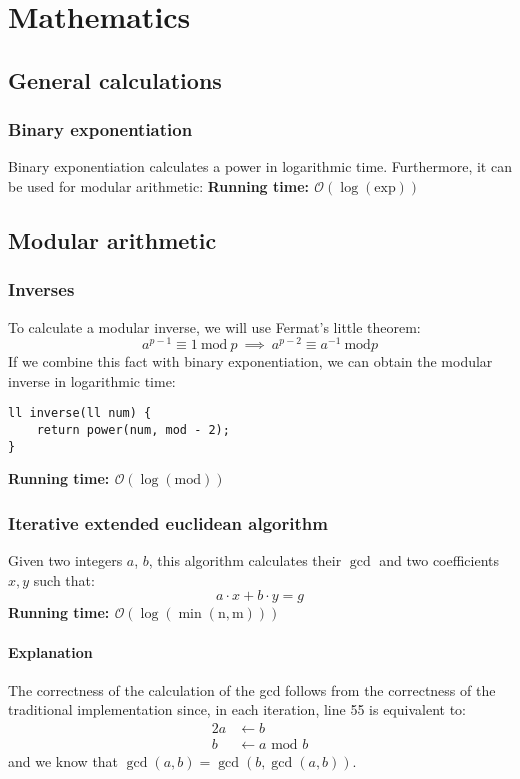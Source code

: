 \chapter{Mathematics}

\section{General calculations}
\subsection{Binary exponentiation}
Binary exponentiation calculates a power in logarithmic 
time. Furthermore, it can be used for modular arithmetic:
\noindent \textbf{\boldmath Running time: $\mathcal{O}(\log(\mathrm{exp}))$}


\newpage
\section{Modular arithmetic}
\subsection{Inverses}
To calculate a modular inverse, we will use Fermat's little theorem:
\[
	a^{p-1}\equiv 1 \ \mathrm{mod} \ p  \ \implies \  a^{p-2}\equiv a^{-1} \ \mathrm{mod} p
\]
If we combine this fact with binary exponentiation, we can obtain the 
modular inverse in logarithmic time:
\begin{verbatim}
ll inverse(ll num) {
    return power(num, mod - 2);
}
\end{verbatim}
\noindent \textbf{\boldmath Running time: $\mathcal{O}(\log(\mathrm{mod}))$}

\subsection{Iterative extended euclidean algorithm}
Given two integers $a$, $b$, this algorithm calculates their $\gcd$ and two 
coefficients $x, y$ such that:
\begin{equation}
		a\cdot x + b\cdot y = g
\label{eq:gdcex}
\end{equation}
\noindent \textbf{\boldmath Running time: $\mathcal{O}(\log(\mathrm{\min(n,m)}))$}
\newpage
\subsubsection*{Explanation}
The correctness of the calculation of the gcd follows from the correctness of the 
traditional implementation since, in each iteration, line 55 is equivalent to: 
\begin{alignat*}{2}
		a &\leftarrow b\\
		b &\leftarrow a \text{ mod } b
\end{alignat*}
and we know that $\gcd(a, b) = \gcd(b, \gcd(a,b))$.


